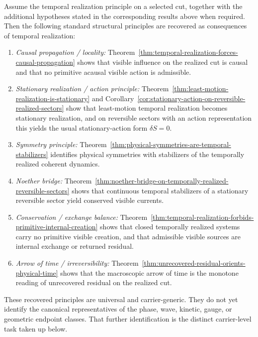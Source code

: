 \begin{proposition}
\label{prop:scoped-recovery-of-standard-principles}
Assume the temporal realization principle on a selected cut, together with the
additional hypotheses stated in the corresponding results above when required.
Then the following standard structural principles are recovered as
consequences of temporal realization:
\begin{enumerate}[label=(\roman*), leftmargin=2em, itemsep=0.2em]
\item \emph{Causal propagation / locality:}
      Theorem~\ref{thm:temporal-realization-forces-causal-propagation} shows
      that visible influence on the realized cut is causal and that no
      primitive acausal visible action is admissible.
\item \emph{Stationary realization / action principle:}
      Theorem~\ref{thm:least-motion-realization-is-stationary} and
      Corollary~\ref{cor:stationary-action-on-reversible-realized-sectors}
      show that least-motion temporal realization becomes stationary
      realization, and on reversible sectors with an action representation this
      yields the usual stationary-action form \(\delta S=0\).
\item \emph{Symmetry principle:}
      Theorem~\ref{thm:physical-symmetries-are-temporal-stabilizers} identifies
      physical symmetries with stabilizers of the temporally realized coherent
      dynamics.
\item \emph{Noether bridge:}
      Theorem~\ref{thm:noether-bridge-on-temporally-realized-reversible-sectors}
      shows that continuous temporal stabilizers of a stationary reversible
      sector yield conserved visible currents.
\item \emph{Conservation / exchange balance:}
      Theorem~\ref{thm:temporal-realization-forbids-primitive-internal-creation}
      shows that closed temporally realized systems carry no primitive visible
      creation, and that admissible visible sources are internal exchange or
      returned residual.
\item \emph{Arrow of time / irreversibility:}
      Theorem~\ref{thm:unrecovered-residual-orients-physical-time} shows that
      the macroscopic arrow of time is the monotone reading of unrecovered
      residual on the realized cut.
\end{enumerate}
These recovered principles are universal and carrier-generic. They do not yet
identify the canonical representatives of the phase, wave, kinetic, gauge, or
geometric endpoint classes. That further identification is the distinct
carrier-level task taken up below.
\end{proposition}

